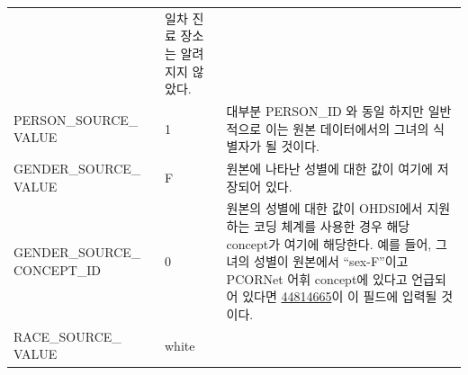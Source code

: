 \documentclass[11pt]{book}
\theoremstyle{definition}
\theoremstyle{definition}
\theoremstyle{definition}
\theoremstyle{remark}
\begin{document}
\begin{longtable}[]{@{}lll@{}}
\begin{minipage}[t]{0.16\columnwidth}
\strut
\end{minipage} & \begin{minipage}[t]{0.48\columnwidth}\raggedright\strut
일차 진료 장소는 알려지지 않았다.\strut
\end{minipage}\tabularnewline
\begin{minipage}[t]{0.28\columnwidth}\raggedright\strut
PERSON\_SOURCE\_ VALUE\strut
\end{minipage} & \begin{minipage}[t]{0.16\columnwidth}\raggedright\strut
1\strut
\end{minipage} & \begin{minipage}[t]{0.48\columnwidth}\raggedright\strut
대부분 PERSON\_ID 와 동일 하지만 일반적으로 이는 원본 데이터에서의
그녀의 식별자가 될 것이다.\strut
\end{minipage}\tabularnewline
\begin{minipage}[t]{0.28\columnwidth}\raggedright\strut
GENDER\_SOURCE\_ VALUE\strut
\end{minipage} & \begin{minipage}[t]{0.16\columnwidth}\raggedright\strut
F\strut
\end{minipage} & \begin{minipage}[t]{0.48\columnwidth}\raggedright\strut
원본에 나타난 성별에 대한 값이 여기에 저장되어 있다.\strut
\end{minipage}\tabularnewline
\begin{minipage}[t]{0.28\columnwidth}\raggedright\strut
GENDER\_SOURCE\_ CONCEPT\_ID\strut
\end{minipage} & \begin{minipage}[t]{0.16\columnwidth}\raggedright\strut
0\strut
\end{minipage} & \begin{minipage}[t]{0.48\columnwidth}\raggedright\strut
원본의 성별에 대한 값이 OHDSI에서 지원하는 코딩 체계를 사용한 경우 해당
concept가 여기에 해당한다. 예를 들어, 그녀의 성별이 원본에서
``sex-F''이고 PCORNet 어휘 concept에 있다고 언급되어 있다면
\href{http://athena.ohdsi.org/search-terms/terms/44814665}{44814665}이
이 필드에 입력될 것이다.\strut
\end{minipage}\tabularnewline
\begin{minipage}[t]{0.28\columnwidth}\raggedright\strut
RACE\_SOURCE\_ VALUE\strut
\end{minipage} & \begin{minipage}[t]{0.16\columnwidth}\raggedright\strut
white\strut
\end{minipage} & \begin{minipage}[t]{0.48\columnwidth}\raggedright\strut

\end{minipage}
\end{longtable}
\end{document}
